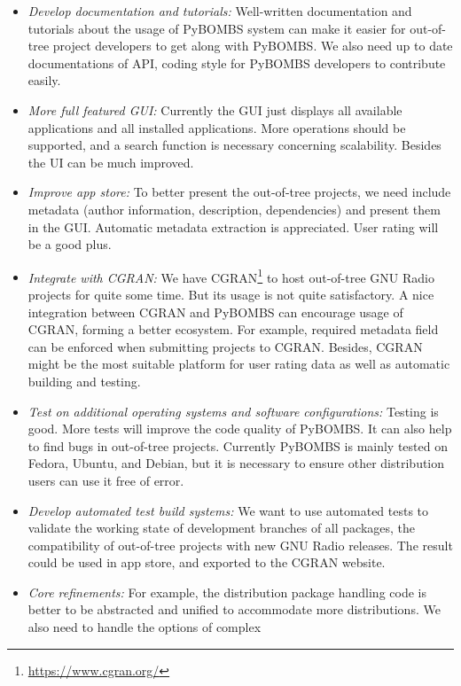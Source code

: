 \documentclass[a4paper]{article}
\begin{document}
\begin{itemize}
  \item \emph{Develop documentation and tutorials:} Well-written
    documentation and tutorials about the usage of PyBOMBS system
    can make it easier for out-of-tree
    project developers to get along with PyBOMBS.
    We also need up to date documentations of API, coding style for
    PyBOMBS developers to contribute easily.
  \item \emph{More full featured GUI:} Currently the GUI just displays
    all available applications and all installed applications.
    More operations should be supported, and a search function is
    necessary concerning scalability. Besides the UI can be much
    improved.
  \item \emph{Improve app store:} To better present the out-of-tree
    projects, we need include metadata (author information, description,
    dependencies) and present them in the GUI. Automatic metadata
    extraction is appreciated. User rating will be a good plus.
  \item \emph{Integrate with CGRAN:} We have CGRAN\footnote{%
    \url{https://www.cgran.org/}} to host out-of-tree
    GNU Radio projects for quite some time. But its usage is not quite
    satisfactory. A nice integration between CGRAN and PyBOMBS can
    encourage usage of CGRAN, forming a better ecosystem. For example,
    required metadata field can be enforced when submitting projects to
    CGRAN. Besides, CGRAN might be the most suitable platform for user
    rating data as well as automatic building and testing.
  \item \emph{Test on additional operating systems and software
    configurations:} Testing is good. More tests will improve the code quality of
    PyBOMBS\@. It can also help to find bugs in out-of-tree projects.
    Currently PyBOMBS is mainly tested on Fedora, Ubuntu, and Debian,
    but it is necessary to ensure other distribution users can use it
    free of error.
  \item \emph{Develop automated test build systems:} We want to use
    automated tests to validate the working state of development
    branches of all packages, the compatibility of out-of-tree projects
    with new GNU Radio releases. The result
    could be used in app store, and exported to the CGRAN website.
  \item \emph{Core refinements:} For example, the distribution package
    handling code is better to be abstracted and unified to accommodate
    more distributions. We also need to handle the options of complex

\end{itemize}
\end{document}
